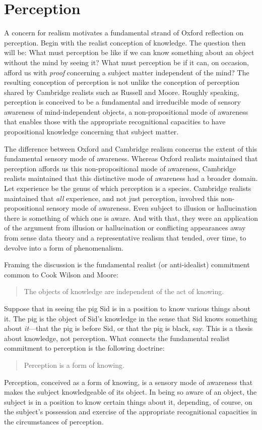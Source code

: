 \section{Perception} %
\label{sec:perception}

A concern for realism motivates a fundamental strand of Oxford reflection on perception. Begin with the realist conception of knowledge.  The question then will be: What must perception be like if we can know something about an object without the mind by seeing it? What must perception be if it can, on occasion, afford us with \emph{proof} concerning a subject matter independent of the mind? The resulting conception of perception is not unlike the conception of perception shared by Cambridge realists such as Russell and Moore. Roughly speaking, perception is conceived to be a fundamental and irreducible mode of sensory awareness of mind-independent objects, a non-propositional mode of awareness that enables those with the appropriate recognitional capacities to have propositional knowledge concerning that subject matter. 

The difference between Oxford and Cambridge realism concerns the extent of this fundamental sensory mode of awareness. Whereas Oxford realists maintained that perception affords us this non-propositional mode of awareness, Cambridge realists maintained that this distinctive mode of awareness had a broader domain. Let experience be the genus of which perception is a species. Cambridge realists maintained that \emph{all} experience, and not just perception, involved this non-propositional sensory mode of awareness. Even subject to illusion or hallucination there is something of which one is aware. And with that, they were an application of the argument from illusion or hallucination or conflicting appearances away from sense data theory and a representative realism that tended, over time, to devolve into a form of phenomenalism.

Framing the discussion is the fundamental realist (or anti-idealist) commitment common to Cook Wilson and Moore:
\begin{quote}
	The objects of knowledge are independent of the act of knowing.
\end{quote}
Suppose that in seeing the pig Sid is in a position to know various things about it. The pig is the object of Sid's knowledge in the sense that Sid knows something about \emph{it}---that the pig is before Sid, or that the pig is black, say. This is a thesis about knowledge, not perception. What connects the fundamental realist commitment to perception is the following doctrine:
\begin{quote}
	Perception is a form of knowing.  
\end{quote}
Perception, conceived as a form of knowing, is a sensory mode of awareness that makes the subject knowledgeable of its object. In being so aware of an object, the subject is in a position to know certain things about it, depending, of course, on the subject's possession and exercise of the appropriate recognitional capacities in the circumstances of perception.

